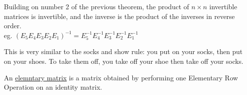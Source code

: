 \documentclass{report}
\begin{document}
\begin{theorem}
Building on number 2 of the previous theorem, the product of $n\times n$ invertible matrices is invertible, and the inverse is the product of the inverses in reverse order.\\
\bigskip
eg. $(E_5E_4E_3E_2E_1)^{-1}=E_5^{-1}E_4^{-1}E_3^{-1}E_2^{-1}E_1^{-1}$
\end{theorem}

This is very similar to the socks and show rule: you put on your socks, then put on your shoes. To take them off, you take off your shoe then take off your socks.

\begin{definition}
An \underline{elemntary matrix} is a matrix obtained by performing one Elementary Row Operation on an identity matrix.
\end{definition}
\end{document}
